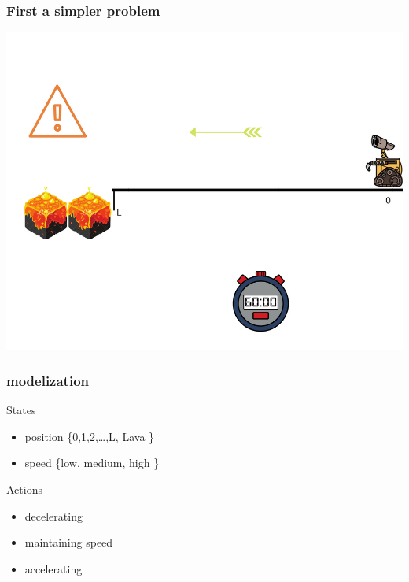 \documentclass[dvipsnames,svgnames]{beamer}
\begin{document}
\begin{frame}
\frametitle{First a simpler problem}
\begin{center}
\includegraphics[scale=0.4]{img/illustration_lava.png}
\end{center}
\end{frame}

\begin{frame}
\frametitle{modelization}
\begin{block}{States}
\begin{itemize}
\item \pause position \{0,1,2,\ldots ,L, Lava  \}
\item \pause speed    \{low, medium, high   \}
\end{itemize}
\end{block}
\pause
\begin{block}{Actions}
\begin{itemize}
\item \pause decelerating 
\item \pause maintaining speed
\item \pause accelerating 
\end{itemize}
\end{block}
\end{frame}
\end{document}
